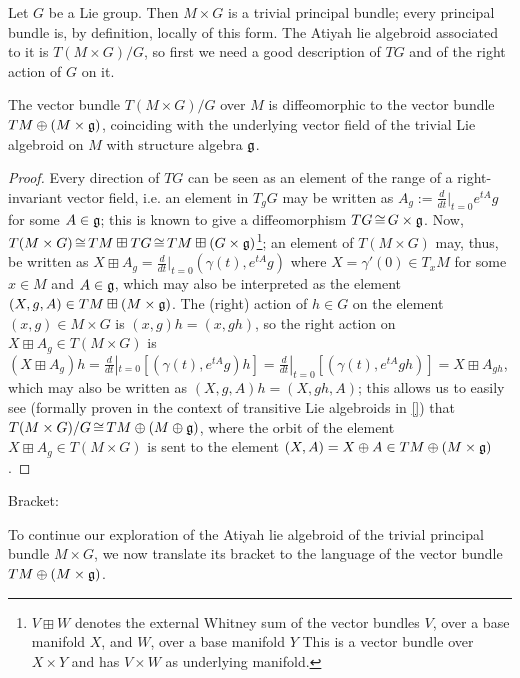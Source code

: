 Let $G$ be a Lie group. Then $M \times G$ is a trivial principal bundle; every principal bundle is, by definition, locally of this form. The Atiyah lie algebroid associated to it is $T(M \times G)/G$, so first we need a good description of $TG$ and of the right action of $G$ on it. 

\begin{proposition}
The vector bundle $T(M \times G)/G$ over $M$ is diffeomorphic to the vector bundle $TM \oplus (M \times \mathfrak{g})$, coinciding with the underlying vector field of the trivial Lie algebroid on $M$ with structure algebra $\mathfrak{g}$.
\end{proposition}

\begin{proof}
Every direction of $TG$ can be seen as an element of the range of a right-invariant vector field, i.e. an element in $T_g G$ may be written as $A_g :=\frac{d}{dt}|_{t=0}e^{tA}g$ for some $A \in \mathfrak{g}$; this is known to give a diffeomorphism $TG \operatorname{\cong} G \times \mathfrak{g}$. Now, $T(M \times G) \operatorname{\cong} TM \boxplus TG \operatorname{\cong} TM \boxplus (G \times \mathfrak{g})$\footnote{$V \boxplus W$ denotes the external Whitney sum of the vector bundles $V$, over a base manifold $X$, and $W$, over a base manifold $Y$ This is a vector bundle over $X \times Y$ and has $V \times W$ as underlying manifold.}; an element of $T(M \times G)$ may, thus, be written as $X \boxplus A_g = \frac{d}{dt}|_{t = 0}(\gamma(t), e^{tA}g)$ where $X = \gamma'(0) \in T_x M$ for some $x \in M$ and $A \in \mathfrak{g}$, which may also be interpreted as the element $(X, g, A) \in TM \boxplus (M \times \mathfrak{g})$. The (right) action of $h \in G$ on the element $(x, g) \in M\times G$ is $(x, g)h = (x, gh)$, so the right action on $X \boxplus A_g \in T(M \times G)$ is $(X \boxplus A_g)h = \frac{d}{dt}|_{t=0}[(\gamma(t), e^{tA}g)h] = \frac{d}{dt}|_{t=0}[(\gamma(t), e^{tA}gh)] = X \boxplus A_{gh}$, which may also be written as $(X, g, A)h = (X, gh, A)$; this allows us to easily see (formally proven in the context of transitive Lie algebroids in \ref{}) that $T(M \times G)/G \operatorname{\cong} TM \oplus (M \oplus \mathfrak{g})$, where the orbit of the element $X \boxplus A_g \in T(M \times G)$ is sent to the element $(X, A) = X \oplus A \in TM \oplus (M \times \mathfrak{g})$.
\end{proof}

Bracket:

To continue our exploration of the Atiyah lie algebroid of the trivial principal bundle $M \times G$, we now translate its bracket to the language of the vector bundle $TM \oplus (M \times \mathfrak{g})$. 

